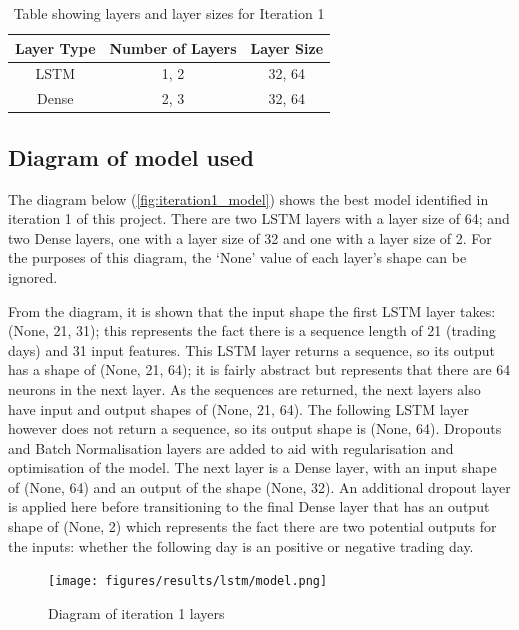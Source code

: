 \begin{table}[ht]
    \centering
    \begin{tabular}{|c|c|c|}
        \hline
        Layer Type & Number of Layers & Layer Size \\
        \hline\hline
        LSTM & 1, 2 & 32, 64 \\
        Dense & 2, 3 & 32, 64 \\
        \hline
    \end{tabular}
    \caption{Table showing layers and layer sizes for Iteration 1}
    \label{tab:iteration1_layers}
\end{table}
\FloatBarrier

\subsection{Diagram of model used}
The diagram below (\autoref{fig:iteration1_model}) shows the best model identified in iteration 1 of this project.
There are two LSTM layers with a layer size of 64; and two Dense layers, one with a layer size of 32 and one with
a layer size of 2. For the purposes of this diagram, the `None' value of each layer's shape can be ignored.

From the diagram, it is shown that the input shape the first LSTM layer takes: (None, 21, 31); this represents the
fact there is a sequence length of 21 (trading days) and 31 input features.  This LSTM layer returns a sequence, so its
output has a shape of (None, 21, 64); it is fairly abstract but represents that there are 64 neurons in the next layer.
As the sequences are returned, the next layers also have input and output shapes of (None, 21, 64). The following LSTM
layer however does not return a sequence, so its output shape is (None, 64).
Dropouts and Batch Normalisation layers are added to aid with regularisation and optimisation of the model.
The next layer is a Dense layer, with an input shape of (None, 64) and an output of the shape (None, 32). An additional
dropout layer is applied here before transitioning to the final Dense layer that has an output shape of (None, 2)
which represents the fact there are two potential outputs for the inputs: whether the following day
is an positive or negative trading day.

\begin{figure}[ht]
    \centering
    \texttt{[image: figures/results/lstm/model.png]}
    \caption[Diagram of iteration 1 layers]{Diagram of iteration 1 layers}
    \label{fig:iteration1_model}
\end{figure}
\FloatBarrier

